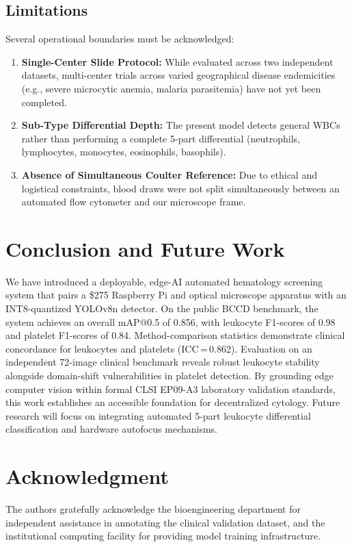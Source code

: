 \documentclass[10pt,conference]{IEEEtran}
\begin{document}
\subsection{Limitations}
Several operational boundaries must be acknowledged:
\begin{enumerate}
  \item \textbf{Single-Center Slide Protocol:} While evaluated across two independent datasets, multi-center trials across varied geographical disease endemicities (e.g., severe microcytic anemia, malaria parasitemia) have not yet been completed.
  \item \textbf{Sub-Type Differential Depth:} The present model detects general WBCs rather than performing a complete 5-part differential (neutrophils, lymphocytes, monocytes, eosinophils, basophils).
  \item \textbf{Absence of Simultaneous Coulter Reference:} Due to ethical and logistical constraints, blood draws were not split simultaneously between an automated flow cytometer and our microscope frame.
\end{enumerate}

\section{Conclusion and Future Work}
\label{sec:conclusion}
We have introduced a deployable, edge-AI automated hematology screening system that pairs a \$275 Raspberry Pi and optical microscope apparatus with an INT8-quantized YOLOv8n detector. On the public BCCD benchmark, the system achieves an overall mAP@0.5 of 0.856, with leukocyte F1-scores of 0.98 and platelet F1-scores of 0.84. Method-comparison statistics demonstrate clinical concordance for leukocytes and platelets (ICC\,=\,0.862). Evaluation on an independent 72-image clinical benchmark reveals robust leukocyte stability alongside domain-shift vulnerabilities in platelet detection. By grounding edge computer vision within formal CLSI EP09-A3 laboratory validation standards, this work establishes an accessible foundation for decentralized cytology. Future research will focus on integrating automated 5-part leukocyte differential classification and hardware autofocus mechanisms.

\section*{Acknowledgment}
The authors gratefully acknowledge the bioengineering department for independent assistance in annotating the clinical validation dataset, and the institutional computing facility for providing model training infrastructure.
\end{document}

